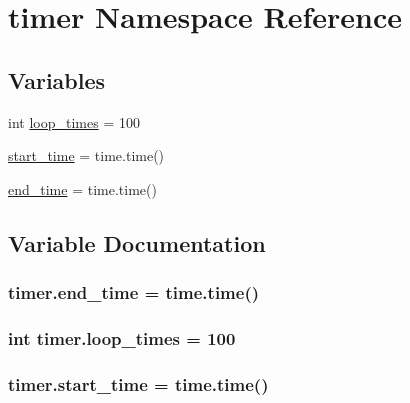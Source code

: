 \hypertarget{namespacetimer}{}\section{timer Namespace Reference}
\label{namespacetimer}
\subsection*{Variables}
\begin{DoxyCompactItemize}
\item 
int \hyperlink{namespacetimer_a5183291c63dada12162d2d2db5bc7c3c}{loop\+\_\+times} = 100
\item 
\hyperlink{namespacetimer_ab45bd0f6c25534fef99fe5f87b0fb7e4}{start\+\_\+time} = time.\+time()
\item 
\hyperlink{namespacetimer_aea0cd3f40ae910c8aae0c4dff8acb892}{end\+\_\+time} = time.\+time()
\end{DoxyCompactItemize}


\subsection{Variable Documentation}
\subsubsection[{\texorpdfstring{end\+\_\+time}{end_time}}]{\setlength{\rightskip}{0pt plus 5cm}timer.\+end\+\_\+time = time.\+time()}\hypertarget{namespacetimer_aea0cd3f40ae910c8aae0c4dff8acb892}{}\label{namespacetimer_aea0cd3f40ae910c8aae0c4dff8acb892}
\subsubsection[{\texorpdfstring{loop\+\_\+times}{loop_times}}]{\setlength{\rightskip}{0pt plus 5cm}int timer.\+loop\+\_\+times = 100}\hypertarget{namespacetimer_a5183291c63dada12162d2d2db5bc7c3c}{}\label{namespacetimer_a5183291c63dada12162d2d2db5bc7c3c}
\subsubsection[{\texorpdfstring{start\+\_\+time}{start_time}}]{\setlength{\rightskip}{0pt plus 5cm}timer.\+start\+\_\+time = time.\+time()}\hypertarget{namespacetimer_ab45bd0f6c25534fef99fe5f87b0fb7e4}{}\label{namespacetimer_ab45bd0f6c25534fef99fe5f87b0fb7e4}
